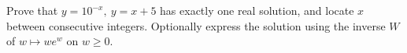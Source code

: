 Prove that $y=10^{-x},\ y=x+5$ has exactly one real solution, and locate $x$ between consecutive integers. Optionally express the solution using the inverse $W$ of $w\mapsto we^w$ on $w\ge0$.
